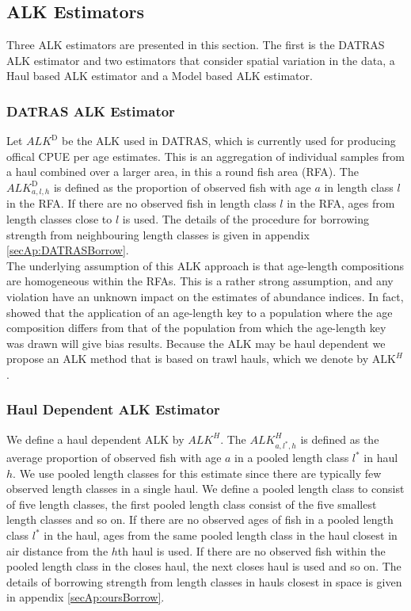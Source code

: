 \documentclass[a4paper 12pt]{article}
\numberwithin{equation}{section}
\begin{document}
\subsection{ALK Estimators}

Three ALK estimators are presented in this section. The first is the DATRAS ALK estimator and two estimators that consider spatial variation in the data, a Haul based ALK estimator and a Model based ALK estimator.

\subsubsection{DATRAS ALK Estimator }
\label{sec:datrasalkestimator}

Let $ALK^{\text{D}}$ be the ALK used in DATRAS, which is currently used for producing offical CPUE per age estimates. This is an aggregation of individual samples from a haul combined over a larger area, in this a round fish area (RFA). The $ALK^{\text{D}}_{a,l,h}$ is defined as the proportion of observed fish with age $a$ in length class $l$ in the RFA. If there are no observed fish in length class $l$ in the RFA, ages from length classes close to $l$ is used. The details of the procedure for borrowing strength from neighbouring length classes is given in appendix \ref{secAp:DATRASBorrow}. \\
\indent The underlying assumption of this ALK approach is that age-length compositions are homogeneous within the RFAs. This is a rather strong assumption, and any violation have an unknown impact on the estimates of abundance indices. In fact, \citet{kimura1977statistical} showed that the application of an age-length key  to a population where the age composition differs from that of the population from which the age-length key was drawn will give bias results. Because the ALK may be haul dependent we propose an ALK method that is based on trawl hauls, which we denote by $\mathrm{ALK}^{H}$. 

\subsubsection{Haul Dependent ALK Estimator}
\label{sec:haulestimator}
We define a haul dependent ALK  by  $ALK^{H}$. The $ALK^{H}_{a,l^*,h}$ is defined as the average proportion of observed fish with age $a$ in a pooled length class $l^*$ in haul $h$. We use pooled length classes for this estimate since there are typically few observed length classes in a single haul. We define a pooled length class to consist of five length classes, the first pooled length class consist of the five smallest length classes and so on.  If there are no observed ages of fish in a pooled length class $l^*$ in the haul, ages from the same pooled length class in the haul closest in air distance from the $h$th haul is used. If there are no observed fish within the pooled length class in the closes haul, the next closes haul is used and so on.  The details of borrowing strength from length classes in hauls closest in space is given in appendix \ref{secAp:oursBorrow}. 
\end{document}
